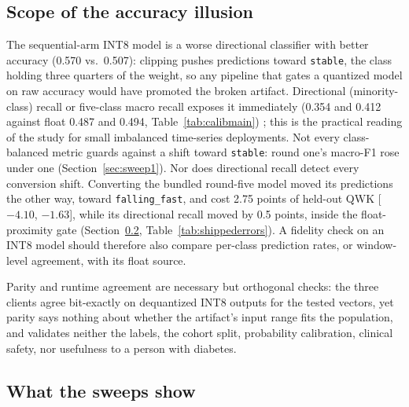 \documentclass[10pt,twocolumn]{article}
\begin{document}
\subsection{Scope of the accuracy illusion}

The sequential-arm INT8 model is a worse directional classifier with
better accuracy (0.570 vs.\ 0.507): clipping pushes predictions toward
\texttt{stable}, the class holding three quarters of the weight, so any
pipeline that gates a quantized model on raw accuracy would have promoted
the broken artifact. Directional (minority-class) recall or five-class
macro recall exposes it immediately (0.354 and 0.412 against float 0.487
and 0.494, Table~\ref{tab:calibmain}) \cite{brodersen2010balanced}; this is
the practical reading of the study for small imbalanced time-series
deployments. Not every class-balanced metric guards against a shift toward
\texttt{stable}: round one's macro-F1 rose under one
(Section~\ref{sec:sweep1}). Nor does directional recall detect every
conversion shift. Converting the bundled round-five model moved its
predictions the other way, toward \texttt{falling\_fast}, and cost 2.75
points of held-out QWK [$-4.10$, $-1.63$], while its directional recall
moved by 0.5 points, inside the float-proximity gate
(Section~\ref{sec:sweepdiscussion}, Table~\ref{tab:shippederrors}). A
fidelity check on an INT8 model should therefore also compare per-class
prediction rates, or window-level agreement, with its float source.

Parity and runtime agreement are necessary but orthogonal checks: the
three clients agree bit-exactly on dequantized INT8 outputs for the
tested vectors, yet parity says nothing about whether the
artifact's input range fits the population, and validates neither the
labels, the cohort split, probability calibration, clinical safety, nor
usefulness to a person with diabetes.

\subsection{What the sweeps show}
\label{sec:sweepdiscussion}
\end{document}
